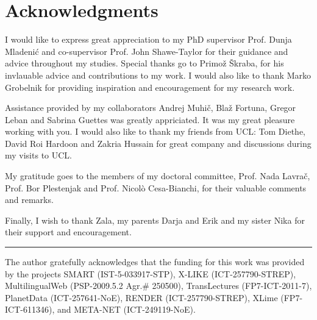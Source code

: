 %
\chapter*{Acknowledgments}

I would like to express great appreciation to my PhD supervisor Prof. Dunja
Mladenić and co-supervisor Prof. John Shawe-Taylor for their guidance and advice
throughout my studies. Special thanks go to Primož Škraba, for his invlauable advice and contributions to my work. 
I would also like to thank Marko Grobelnik for providing inspiration and encouragement for my research work.

Assistance provided by my collaborators Andrej Muhič, Blaž Fortuna, Gregor Leban 
and Sabrina Guettes was greatly appriciated. It was my great pleasure working with you.
I would also like to thank my friends from UCL: Tom Diethe, David Roi Hardoon and Zakria Hussain
for great company and discussions during my visits to UCL.

My gratitude goes to the members of my doctoral committee, Prof. Nada Lavrač, Prof.
Bor Plestenjak and Prof. Nicolò Cesa-Bianchi, for their valuable comments and
remarks.

Finally, I wish to thank Zala, my parents Darja and Erik and my sister Nika 
for their support and encouragement.

\rule{0.5\textwidth}{.4pt}

The author gratefully acknowledges that the funding for this work was provided by the projects
SMART (IST-5-033917-STP), X-LIKE (ICT-257790-STREP), MultilingualWeb (PSP-2009.5.2 Agr.\# 250500), 
TransLectures (FP7-ICT-2011-7), PlanetData (ICT-257641-NoE), RENDER (ICT-257790-STREP), XLime (FP7-ICT-611346), 
and META-NET (ICT-249119-NoE). 